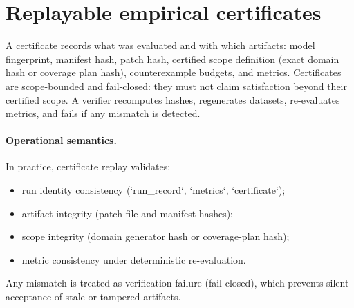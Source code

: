 \section{Replayable empirical certificates}
\label{sec:certificates}
A certificate records what was evaluated and with which artifacts: model fingerprint, manifest hash, patch hash, certified scope definition (exact domain hash or coverage plan hash), counterexample budgets, and metrics.
Certificates are scope-bounded and fail-closed: they must not claim satisfaction beyond their certified scope.
A verifier recomputes hashes, regenerates datasets, re-evaluates metrics, and fails if any mismatch is detected.

\paragraph{Operational semantics.}
In practice, certificate replay validates:
\begin{itemize}[leftmargin=*,nosep]
\item run identity consistency (`run\_record`, `metrics`, `certificate`);
\item artifact integrity (patch file and manifest hashes);
\item scope integrity (domain generator hash or coverage-plan hash);
\item metric consistency under deterministic re-evaluation.
\end{itemize}
Any mismatch is treated as verification failure (fail-closed), which prevents silent acceptance of stale or tampered artifacts.
